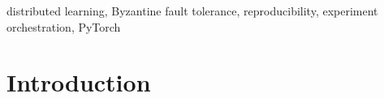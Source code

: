 \documentclass[twoside,11pt]{article}
\begin{document}
\begin{abstract}
{\begin{itemize}
\begin{itemize}
\begin{itemize}
            \item Programmatic Python API vs JSON configuration files (ByzFL) or CLI (FL-Byz-Lib)
        \end{itemize}
    \end{itemize}
    \item What it interfaces with: faithful reproductions of NeurIPS 2017, ICML 2018, ICML 2023 protocols + orchestration API
    \item License + repo: MIT license, available at \url{https://github.com/calicarpa/krum}
\end{itemize}
}

\end{abstract}

\begin{keywords}
distributed learning, Byzantine fault tolerance, reproducibility, experiment orchestration, PyTorch
\end{keywords}

\section{Introduction}
\end{document}
